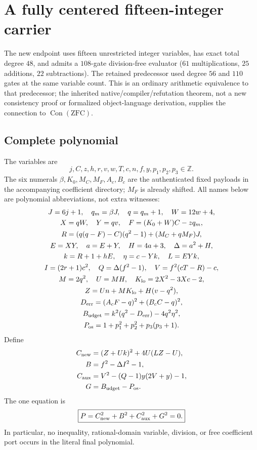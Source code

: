 \section{A fully centered fifteen-integer carrier}
\label{sec:centered15}
The new endpoint uses fifteen unrestricted integer variables, has exact total degree
$48$, and admits a $108$-gate division-free evaluator
($61$ multiplications, $25$ additions, $22$ subtractions).
The retained predecessor used degree $56$ and $110$ gates at the same variable count.
This is an ordinary arithmetic equivalence to that predecessor; the inherited
native/compiler/refutation theorem, not a new consistency proof or formalized
object-language derivation, supplies the connection to $\operatorname{Con}(\mathrm{ZFC})$.

\subsection{Complete polynomial}
The variables are
\[
 j,C,z,h,r,v,w,T,c,n,f,y,p_1,p_2,p_3\in\mathbb Z.
\]
The six numerals $\beta,K_0,M_C,M_F,A_c,B_c$ are the authenticated fixed
payloads in the accompanying coefficient directory; $M_F$ is already shifted.
All names below are polynomial abbreviations, not extra witnesses:
\begin{gather*}
 J=6j+1,\quad  q_m=\beta J,\quad q=q_m+1,\quad W=12w+4,\\
 X=qW,\quad Y=qv,\quad  F=(K_0+W)C-zq_m,\\
 R=(q(q-F)-C)(q^2-1)+(M_C+qM_F)J,\\
 E=XY,\quad a=E+Y,\quad H=4a+3,\quad \Delta=a^2+H,\\
 k=R+1+hE,\quad \eta=c-Yk,\quad L=EYk,\\
 I=(2r+1)c^2,\quad Q=\Delta(f^2-1),\quad V=f^2(cT-R)-c,\\
 M=2q^2,\quad U=MH,\quad K_{\rm lo}=2X^2-3Xc-2,\\
 Z=Un+MK_{\rm lo}+H(v-q^2),\\
 D_{\rm err}=(A_cF-q)^2+(B_cC-q)^2,\\
 B_{\rm udget}=k^2(q^2-D_{\rm err})-4q^2\eta^2,\\
 P_{\rm os}=1+p_1^2+p_2^2+p_3(p_3+1).
\end{gather*}
Define
\begin{align*}
 C_{\rm new}&=(Z+Uk)^2+4U(LZ-U),\\
 B&=f^2-\Delta I^2-1,\\
 C_{\rm aux}&=V^2-(Q-1)y(2V+y)-1,\\
 G&=B_{\rm udget}-P_{\rm os}.
\end{align*}
The one equation is
\[
 \boxed{P=C_{\rm new}^2+B^2+C_{\rm aux}^2+G^2=0.}
\]
In particular, no inequality, rational-domain variable, division, or free
coefficient port occurs in the literal final polynomial.

